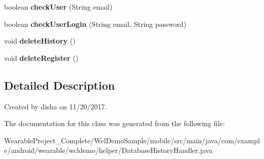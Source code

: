 \begin{DoxyCompactItemize}
\item 
boolean {\bfseries check\+User} (String email)\hypertarget{classcom_1_1example_1_1android_1_1wearable_1_1wcldemo_1_1helper_1_1DatabaseHistoryHandler_a022a0dec7f476cd2ed93ff6d4dfe9f45}{}\label{classcom_1_1example_1_1android_1_1wearable_1_1wcldemo_1_1helper_1_1DatabaseHistoryHandler_a022a0dec7f476cd2ed93ff6d4dfe9f45}

\item 
boolean {\bfseries check\+User\+Login} (String email, String password)\hypertarget{classcom_1_1example_1_1android_1_1wearable_1_1wcldemo_1_1helper_1_1DatabaseHistoryHandler_adbad353dd764fc7caeb19260fcbb96fc}{}\label{classcom_1_1example_1_1android_1_1wearable_1_1wcldemo_1_1helper_1_1DatabaseHistoryHandler_adbad353dd764fc7caeb19260fcbb96fc}

\item 
void {\bfseries delete\+History} ()\hypertarget{classcom_1_1example_1_1android_1_1wearable_1_1wcldemo_1_1helper_1_1DatabaseHistoryHandler_a505f4411c017c77cd15caa8e9e4fef2e}{}\label{classcom_1_1example_1_1android_1_1wearable_1_1wcldemo_1_1helper_1_1DatabaseHistoryHandler_a505f4411c017c77cd15caa8e9e4fef2e}

\item 
void {\bfseries delete\+Register} ()\hypertarget{classcom_1_1example_1_1android_1_1wearable_1_1wcldemo_1_1helper_1_1DatabaseHistoryHandler_a49c338d91bcd0b71d57647d176ce61bd}{}\label{classcom_1_1example_1_1android_1_1wearable_1_1wcldemo_1_1helper_1_1DatabaseHistoryHandler_a49c338d91bcd0b71d57647d176ce61bd}

\end{DoxyCompactItemize}


\subsection{Detailed Description}
Created by disha on 11/20/2017. 

The documentation for this class was generated from the following file\+:\begin{DoxyCompactItemize}
\item 
Wearable\+Project\+\_\+\+Complete/\+Wcl\+Demo\+Sample/mobile/src/main/java/com/example/android/wearable/wcldemo/helper/Database\+History\+Handler.\+java\end{DoxyCompactItemize}
